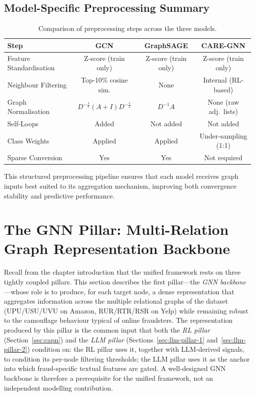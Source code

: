 \subsection{Model-Specific Preprocessing Summary}

\begin{table}[h!]
\centering
\begin{tabular}{|l|c|c|c|}
\hline
\textbf{Step} & \textbf{GCN} & \textbf{GraphSAGE} & \textbf{CARE-GNN} \\
\hline
Feature Standardisation & Z-score (train only) & Z-score (train only) & Z-score (train only) \\
Neighbour Filtering & Top-10\% cosine sim. & None & Internal (RL-based) \\
Graph Normalisation & \( D^{-\frac{1}{2}}(A+I)D^{-\frac{1}{2}} \) & \( D^{-1}A \) & None (raw adj.\ lists) \\
Self-Loops & Added & Not added & Not added \\
Class Weights & Applied & Applied & Under-sampling (1:1) \\
Sparse Conversion & Yes & Yes & Not required \\
\hline
\end{tabular}
\caption{Comparison of preprocessing steps across the three models.}
\end{table}

\noindent
This structured preprocessing pipeline ensures that each model receives graph inputs best suited to its aggregation mechanism, improving both convergence stability and predictive performance.



\section{The GNN Pillar: Multi-Relation Graph Representation Backbone}
\label{sec:gnn-pillar}

Recall from the chapter introduction that the unified framework rests on three tightly coupled pillars. This section describes the first pillar---the \emph{GNN backbone}---whose role is to produce, for each target node, a dense representation that aggregates information across the multiple relational graphs of the dataset (UPU/USU/UVU on Amazon, RUR/RTR/RSR on Yelp) while remaining robust to the camouflage behaviour typical of online fraudsters. The representation produced by this pillar is the common input that both the \emph{RL pillar} (Section~\ref{sec:capn}) and the \emph{LLM pillar} (Sections~\ref{sec:llm-pillar-1} and~\ref{sec:llm-pillar-2}) condition on: the RL pillar uses it, together with LLM-derived signals, to condition its per-node filtering thresholds; the LLM pillar uses it as the anchor into which fraud-specific textual features are gated. A well-designed GNN backbone is therefore a prerequisite for the unified framework, not an independent modelling contribution.

